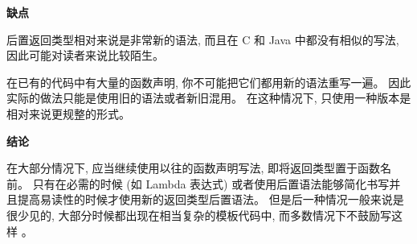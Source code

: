 \textbf{缺点}

后置返回类型相对来说是非常新的语法, 而且在 C 和 Java 中都没有相似的写法, 因此可能对读者来说比较陌生。

在已有的代码中有大量的函数声明, 你不可能把它们都用新的语法重写一遍。 因此实际的做法只能是使用旧的语法或者新旧混用。 在这种情况下, 只使用一种版本是相对来说更规整的形式。

\textbf{结论}

在大部分情况下, 应当继续使用以往的函数声明写法, 即将返回类型置于函数名前。 只有在必需的时候 (如 Lambda 表达式) 或者使用后置语法能够简化书写并且提高易读性的时候才使用新的返回类型后置语法。 但是后一种情况一般来说是很少见的, 大部分时候都出现在相当复杂的模板代码中, 而多数情况下不鼓励写这样 。
